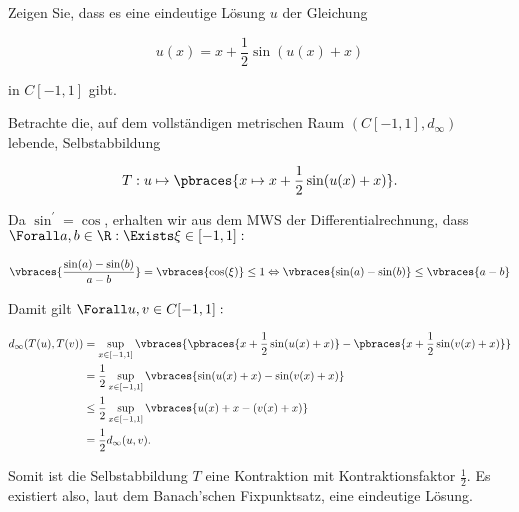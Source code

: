 \begin{exercise}

Zeigen Sie, dass es eine eindeutige Lösung $u$ der Gleichung

\begin{equation*}
  u(x) = x + \frac{1}{2}\sin(u(x)+x)
\end{equation*}

in $C[-1,1]$ gibt.

\end{exercise}

\begin{solution}

Betrachte die, auf dem vollständigen metrischen Raum $(C[-1, 1], d_\infty)$ lebende, Selbstabbildung

\begin{equation*}
  T: u \mapsto \pbraces{x \mapsto x + \frac{1}{2}\sin(u(x)+x)}.
\end{equation*}

Da $\sin^\prime = \cos$, erhalten wir aus dem MWS der Differentialrechnung, dass $\Forall a, b \in \R: \Exists \xi \in [-1,1]:$

\begin{align*}
  \vbraces{\frac{\sin(a)-\sin(b)}{a-b}} = \vbraces{\cos(\xi)} \leq 1 \Leftrightarrow
  \vbraces{\sin(a)-\sin(b)} \leq \vbraces{a-b}
\end{align*}

Damit gilt $\Forall u, v \in C[-1, 1]:$

\begin{align*}
  d_\infty(T(u),T(v))
  & = \sup_{x \in [-1, 1]} \vbraces
  {
    \pbraces{x + \frac{1}{2} \sin(u(x) + x)} -
    \pbraces{x + \frac{1}{2} \sin(v(x) + x)}
  } \\
  & = \frac{1}{2} \sup_{x \in [-1, 1]} \vbraces
  {
    \sin(u(x) + x) -
    \sin(v(x) + x)
  } \\
  & \leq \frac{1}{2}
         \sup_{x \in [-1, 1]}
         \vbraces{u(x) + x - (v(x) + x)} \\
  & = \frac{1}{2}
      d_\infty(u, v).
\end{align*}

Somit ist die Selbstabbildung $T$ eine Kontraktion mit Kontraktionsfaktor $\frac{1}{2}$. Es existiert also, laut dem Banach'schen Fixpunktsatz, eine
eindeutige Lösung.

\end{solution}
